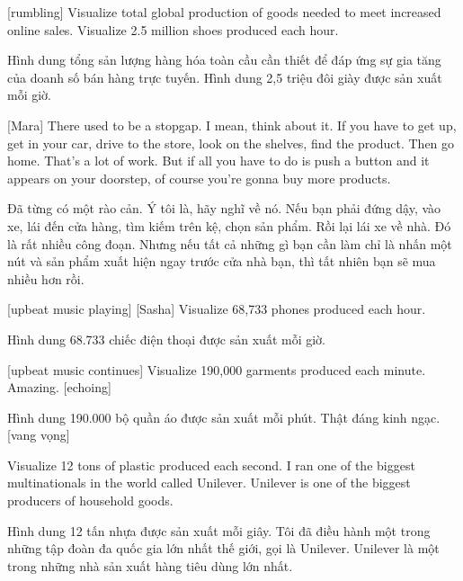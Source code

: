 \documentclass[a4paper]{article}
\begin{document}
	[rumbling]
	Visualize total global production of goods needed to meet increased online sales.
	Visualize 2.5 million shoes produced each hour.
	
	\begin{vietnamese-v2}
		[tiếng ầm ầm] 
		Hình dung tổng sản lượng hàng hóa toàn cầu cần thiết để đáp ứng sự gia tăng của doanh số bán hàng trực tuyến. 
		Hình dung 2,5 triệu đôi giày được sản xuất mỗi giờ.
	\end{vietnamese-v2}
	
	[Mara] There used to be a stopgap. I mean, think about it.
	If you have to get up, get in your car, drive to the store, look on the shelves, find the product.
	Then go home.
	That's a lot of work.
	But if all you have to do is push a button and it appears on your doorstep, of course you're gonna buy more products.
	
	\begin{vietnamese-v2}
		[Mara] Đã từng có một rào cản. Ý tôi là, hãy nghĩ về nó. 
		Nếu bạn phải đứng dậy, vào xe, lái đến cửa hàng, tìm kiếm trên kệ, chọn sản phẩm. 
		Rồi lại lái xe về nhà. Đó là rất nhiều công đoạn. 
		Nhưng nếu tất cả những gì bạn cần làm chỉ là nhấn một nút và sản phẩm xuất hiện ngay trước cửa nhà bạn, thì tất nhiên bạn sẽ mua nhiều hơn rồi.
	\end{vietnamese-v2}
	
	[upbeat music playing]
	[Sasha] Visualize 68,733 phones produced each hour.
	
	\begin{vietnamese-v2}
		 Hình dung 68.733 chiếc điện thoại được sản xuất mỗi giờ.
	\end{vietnamese-v2}
	
	[upbeat music continues]
	Visualize 190,000 garments produced each minute.
	Amazing. [echoing]
	
	\begin{vietnamese-v2}
		Hình dung 190.000 bộ quần áo được sản xuất mỗi phút. 
		Thật đáng kinh ngạc. [vang vọng]
	\end{vietnamese-v2}
	
	Visualize 12 tons of plastic produced each second. I ran one of the biggest multinationals in the world called Unilever.
	Unilever is one of the biggest producers of household goods.
	
	\begin{vietnamese-v2}
		Hình dung 12 tấn nhựa được sản xuất mỗi giây. Tôi đã điều hành một trong những tập đoàn đa quốc gia lớn nhất thế giới, gọi là Unilever. 
		Unilever là một trong những nhà sản xuất hàng tiêu dùng lớn nhất.
	\end{vietnamese-v2}
	
\end{document}
